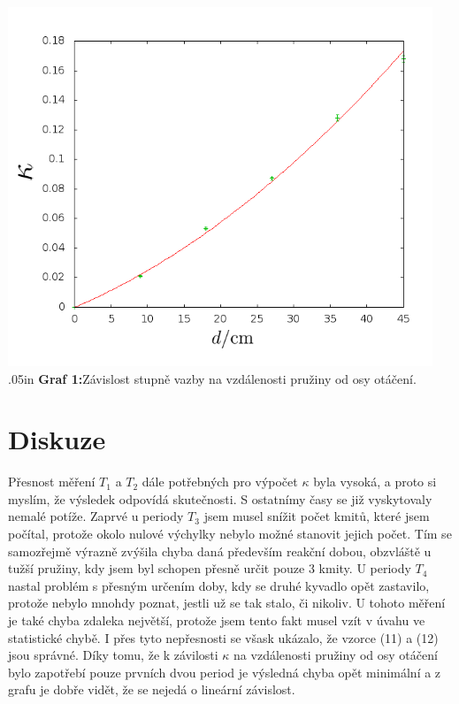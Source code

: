 \documentclass[a4paper,12pt]{article}
\begin{document}
\begin{center}
\includegraphics[width=5in]{graf1.png}
\vglue.05in
\textbf{Graf 1:}Závislost stupně vazby na vzdálenosti pružiny od osy otáčení.
\end{center}

\section{Diskuze}
\noindent 
Přesnost měření $T_1$ a $T_2$ dále potřebných pro výpočet $\kappa$ byla vysoká, a proto si myslím, že výsledek odpovídá skutečnosti. S ostatnímy časy se již vyskytovaly nemalé potíže. Zaprvé u periody $T_3$ jsem musel snížit počet kmitů, které jsem počítal, protože okolo nulové výchylky nebylo možné stanovit jejich počet. Tím se samozřejmě výrazně zvýšila chyba daná především reakční dobou, obzvláště u tužší pružiny, kdy jsem byl schopen přesně určit pouze 3 kmity. U periody $T_4$ nastal problém s přesným určením doby, kdy se druhé kyvadlo opět zastavilo, protože nebylo mnohdy poznat, jestli už se tak stalo, či nikoliv. U tohoto měření je také chyba zdaleka největší, protože jsem tento fakt musel vzít v úvahu ve statistické chybě. I přes tyto nepřesnosti se všask ukázalo, že vzorce (11) a (12) jsou správné.
Díky tomu, že k závilosti $\kappa$ na vzdálenosti pružiny od osy otáčení bylo zapotřebí pouze prvních dvou period je výsledná chyba opět minimální a z grafu je dobře vidět, že se nejedá o lineární závislost.
\end{document}
